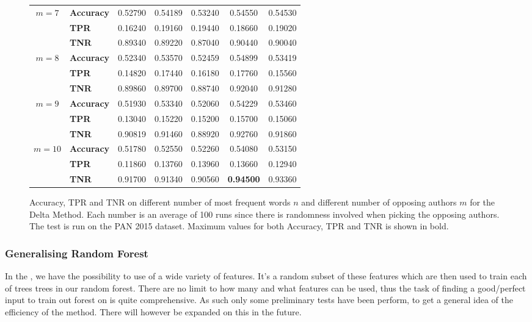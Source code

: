 \begin{figure}
\begin{tabular}{c|lccccc}
        \hline
        $m=7$  & \textbf{Accuracy} & 0.52790 & 0.54189 & 0.53240 & 0.54550 & 0.54530 \\
               & \textbf{TPR}      & 0.16240 & 0.19160 & 0.19440 & 0.18660 & 0.19020 \\
               & \textbf{TNR}      & 0.89340 & 0.89220 & 0.87040 & 0.90440 & 0.90040 \\
        \hline
        $m=8$  & \textbf{Accuracy} & 0.52340 & 0.53570 & 0.52459 & 0.54899 & 0.53419 \\
               & \textbf{TPR}      & 0.14820 & 0.17440 & 0.16180 & 0.17760 & 0.15560 \\
               & \textbf{TNR}      & 0.89860 & 0.89700 & 0.88740 & 0.92040 & 0.91280 \\
        \hline
        $m=9$  & \textbf{Accuracy} & 0.51930 & 0.53340 & 0.52060 & 0.54229 & 0.53460 \\
               & \textbf{TPR}      & 0.13040 & 0.15220 & 0.15200 & 0.15700 & 0.15060 \\
               & \textbf{TNR}      & 0.90819 & 0.91460 & 0.88920 & 0.92760 & 0.91860 \\
        \hline
        $m=10$ & \textbf{Accuracy} & 0.51780 & 0.52550 & 0.52260 & 0.54080 & 0.53150 \\
               & \textbf{TPR}      & 0.11860 & 0.13760 & 0.13960 & 0.13660 & 0.12940 \\
               & \textbf{TNR}      & 0.91700 & 0.91340 & 0.90560 & \textbf{0.94500} & 0.93360
    \end{tabular}
    \caption{Accuracy, \gls{TPR} and \gls{TNR} on different number of most
        frequent words $n$ and different number of opposing authors $m$ for the
        Delta Method. Each number is an average of 100 runs since there is
        randomness involved when picking the opposing authors. The test is run
        on the PAN 2015 dataset. Maximum values for both Accuracy, \gls{TPR} and
        \gls{TNR} is shown in bold.}
    \label{fig:delta_pan_2015_res}
\end{figure}

\subsubsection{Generalising Random Forest}
In the , we have the possibility
to use of a wide variety of features. It's a random subset of these features
which are then used to train each of trees trees in our random forest. There are
no limit to how many and what features can be used, thus the task of finding
a good/perfect input to train out forest on is quite comprehensive. As such
only some preliminary tests have been perform, to get a general idea of the
efficiency of the method. There will however be expanded on this in the future.

